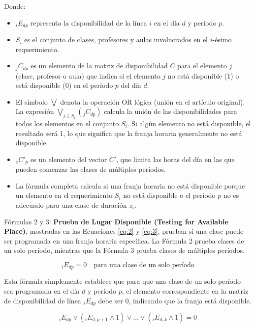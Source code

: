 Donde:
\begin{itemize}
    \item \( _iE_{dp} \) representa la disponibilidad de la línea \( i \) en el día \( d \) y período \( p \).
    \item \( S_i \) es el conjunto de clases, profesores y aulas involucrados en el \( i \)-ésimo requerimiento.
    \item \( _jC_{dp} \) es un elemento de la matriz de disponibilidad \( C \) para el elemento \( j \) (clase, profesor o aula) que indica si el elemento \( j \) no está disponible (1) o está disponible (0) en el período \( p \) del día \( d \).
    \item El símbolo \(\bigvee\) denota la operación OR lógica (unión en el artículo original).
    La expresión \(\bigvee_{j \in S_i} (_jC_{dp})\) calcula la unión de las disponibilidades para todos los elementos en el conjunto \( S_i \).
    Si algún elemento no está disponible, el resultado será 1, lo que significa que la franja horaria generalmente no está disponible.
    \item \( _zC'_{p} \) es un elemento del vector \( C' \), que limita las horas del día en las que pueden comenzar las clases de múltiples períodos.
    \item La fórmula completa calcula si una franja horaria no está disponible porque un elemento en el requerimiento \( S_i \) no está disponible o el período \( p \) no es adecuado para una clase de duración \( z_i \).
\end{itemize}

Fórmulas 2 y 3: \textbf{Prueba de Lugar Disponible (Testing for Available Place)}, mostradas en las Ecuaciones \ref{eq:2} y \ref{eq:3}, prueban si una clase puede ser programada en una franja horaria específica.
La Fórmula 2 prueba clases de un solo período, mientras que la Fórmula 3 prueba clases de múltiples períodos.

\begin{equation}
\label{eq:2}
_iE_{dp} = 0 \quad \text{para una clase de un solo período}
\end{equation}

Esta fórmula simplemente establece que para que una clase de un solo período sea programada en el día \( d \) y período \( p \), el elemento correspondiente en la matriz de disponibilidad de línea \( _iE_{dp} \) debe ser 0, indicando que la franja está disponible.

\begin{equation}
\label{eq:3}
_iE_{dp} \vee (_iE_{d,p+1} \wedge 1) \vee \dots \vee (_iE_{d,k} \wedge 1) = 0
\end{equation}


